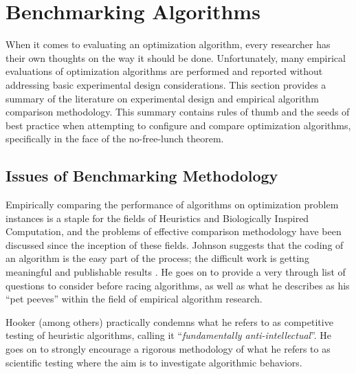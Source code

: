 
\section{Benchmarking Algorithms} 
\label{advanced:sec:racing_algorithms}

When it comes to evaluating an optimization algorithm, every researcher has their own thoughts on the way it should be done. Unfortunately, many empirical evaluations of optimization algorithms are performed and reported without addressing basic experimental design considerations. This section provides a summary of the literature on experimental design and empirical algorithm comparison methodology. This summary contains rules of thumb and the seeds of best practice when attempting to configure and compare optimization algorithms, specifically in the face of the no-free-lunch theorem.

% 
% 
\subsection{Issues of Benchmarking Methodology}
Empirically	comparing	the	performance	of algorithms on optimization problem instances is a staple for the fields of Heuristics and Biologically Inspired Computation, and the problems of effective comparison methodology have been discussed since the inception of these fields. Johnson suggests that the coding of an algorithm is the easy part of the process; the difficult work is getting meaningful and publishable results \cite{Johnson2002a}. He goes on to provide a very through list of questions to consider before racing algorithms, as well as what he describes as his ``pet peeves'' within the field of empirical algorithm research.

Hooker \cite{Hooker1995} (among others) practically condemns what he refers to as competitive testing of heuristic algorithms, calling it ``\emph{fundamentally anti-intellectual}''. He goes on to strongly encourage a rigorous methodology of what he refers to as scientific testing where the aim is to investigate algorithmic behaviors. 

